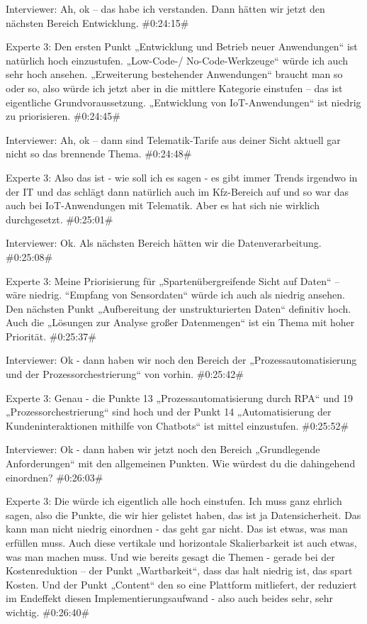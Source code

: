 Interviewer:
Ah, ok – das habe ich verstanden. Dann hätten wir jetzt den nächsten Bereich Entwicklung.
\#0:24:15\#

Experte 3:
Den ersten Punkt „Entwicklung und Betrieb neuer Anwendungen“ ist natürlich hoch einzustufen. „Low-Code-/ No-Code-Werkzeuge“ würde ich auch sehr hoch ansehen. „Erweiterung bestehender Anwendungen“ braucht man so oder so, also würde ich jetzt aber in die mittlere Kategorie einstufen – das ist eigentliche Grundvoraussetzung. „Entwicklung von IoT-Anwendungen“ ist niedrig zu priorisieren.
\#0:24:45\#

Interviewer:
Ah, ok – dann sind Telematik-Tarife aus deiner Sicht aktuell gar nicht so das brennende Thema.
\#0:24:48\#

Experte 3:
Also das ist - wie soll ich es sagen - es gibt immer Trends irgendwo in der IT und das schlägt dann natürlich auch im Kfz-Bereich auf und so war das auch bei IoT-Anwendungen mit Telematik. Aber es hat sich nie wirklich durchgesetzt.
\#0:25:01\#

Interviewer:
Ok. Als nächsten Bereich hätten wir die Datenverarbeitung.
\#0:25:08\#

Experte 3:
Meine Priorisierung für „Spartenübergreifende Sicht auf Daten“ – wäre niedrig. “Empfang von Sensordaten“ würde ich auch als niedrig ansehen. Den nächsten Punkt „Aufbereitung der unstrukturierten Daten“ definitiv hoch. Auch die „Lösungen zur Analyse großer Datenmengen“ ist ein Thema mit hoher Priorität.
\#0:25:37\#

Interviewer:
Ok - dann haben wir noch den Bereich der „Prozessautomatisierung und der Prozessorchestrierung“ von vorhin.
\#0:25:42\#

Experte 3:
Genau - die Punkte 13 „Prozessautomatisierung durch RPA“ und 19 „Prozessorchestrierung“ sind hoch und der Punkt 14 „Automatisierung der Kundeninteraktionen mithilfe von Chatbots“ ist mittel einzustufen.
\#0:25:52\#

Interviewer:
Ok - dann haben wir jetzt noch den Bereich „Grundlegende Anforderungen“ mit den allgemeinen Punkten. Wie würdest du die dahingehend einordnen?
\#0:26:03\#

Experte 3:
Die würde ich eigentlich alle hoch einstufen. Ich muss ganz ehrlich sagen, also die Punkte, die wir hier gelistet haben, das ist ja Datensicherheit. Das kann man nicht niedrig einordnen - das geht gar nicht. Das ist etwas, was man erfüllen muss. Auch diese vertikale und horizontale Skalierbarkeit ist auch etwas, was man machen muss. Und wie bereits gesagt die Themen - gerade bei der Kostenreduktion – der Punkt „Wartbarkeit“, dass das halt niedrig ist, das spart Kosten. Und der Punkt „Content“ den so eine Plattform mitliefert, der reduziert im Endeffekt diesen Implementierungsaufwand - also auch beides sehr, sehr wichtig.
\#0:26:40\#


